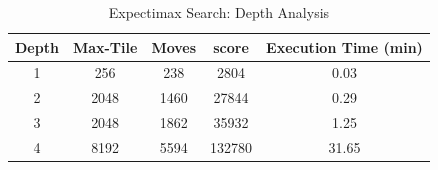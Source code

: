 \documentclass{svproc}
\begin{document}



    

    \begin{table}[t]
    \centering
    \caption{Expectimax Search: Depth Analysis}
    \label{depth-analysis}
    \begin{tabular}{|c|c|c|c|c|}
        \hline
        Depth & Max-Tile & Moves & score & Execution Time (min)\\
         \hline 
    1 & 256  & 238  & 2804   & 0.03   \\
    2 & 2048 & 1460 & 27844  & 0.29   \\
    3 & 2048 & 1862 & 35932  & 1.25   \\
    4 & 8192 & 5594 & 132780 & 31.65 \\
     \hline 
        \end{tabular}
        \end{table}
        
\end{document}
